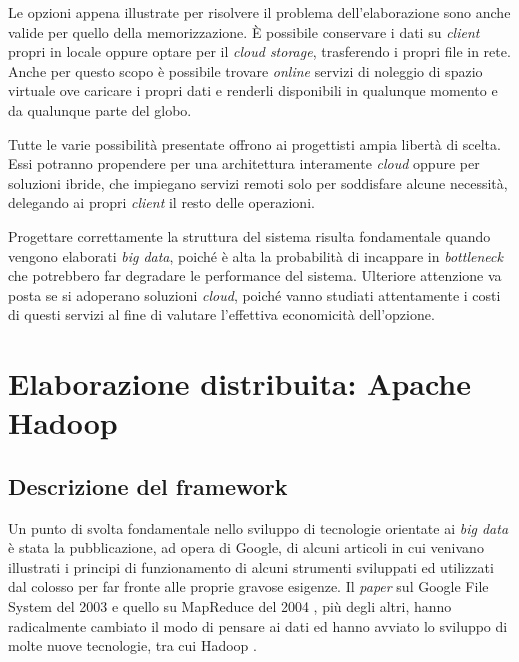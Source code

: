 Le opzioni appena illustrate per risolvere il problema dell’elaborazione sono anche valide per quello della memorizzazione. È possibile conservare i dati su \textit{client} propri 
in locale oppure optare per il \textit{cloud storage}, trasferendo i propri file in rete. Anche per questo scopo è possibile trovare \textit{online} servizi di noleggio di spazio virtuale 
ove caricare i propri dati e renderli disponibili in qualunque momento e da qualunque parte del globo.

Tutte le varie possibilità presentate offrono ai progettisti ampia libertà di scelta. Essi potranno propendere per una architettura interamente \textit{cloud} oppure per soluzioni 
ibride, che impiegano servizi remoti solo per soddisfare alcune necessità, delegando ai propri \textit{client} il resto delle operazioni. 

Progettare correttamente la struttura del sistema risulta fondamentale quando vengono elaborati \textit{big data}, poiché è alta la probabilità di incappare in \textit{bottleneck} che potrebbero
far degradare le performance del sistema. Ulteriore attenzione va posta se si adoperano soluzioni \textit{cloud}, poiché vanno studiati attentamente i costi di questi servizi al fine
di valutare l’effettiva economicità dell’opzione.

\chapter{Elaborazione distribuita: Apache Hadoop}
\label{chap:hadoop}

\section{Descrizione del framework}

Un punto di svolta fondamentale nello sviluppo di tecnologie orientate ai \textit{big data} è stata la pubblicazione, ad opera di Google, di alcuni articoli in cui venivano illustrati i 
principi di funzionamento di alcuni strumenti sviluppati ed utilizzati dal colosso per far fronte alle proprie gravose esigenze. Il \textit{paper} sul Google File System del 
2003 \cite{google:filesystem} e quello su MapReduce del 2004 \cite{google:mapreduce}, più degli altri, hanno radicalmente cambiato il modo di pensare ai dati ed hanno avviato 
lo sviluppo di molte nuove tecnologie, tra cui Hadoop \cite{hadoop}. 

